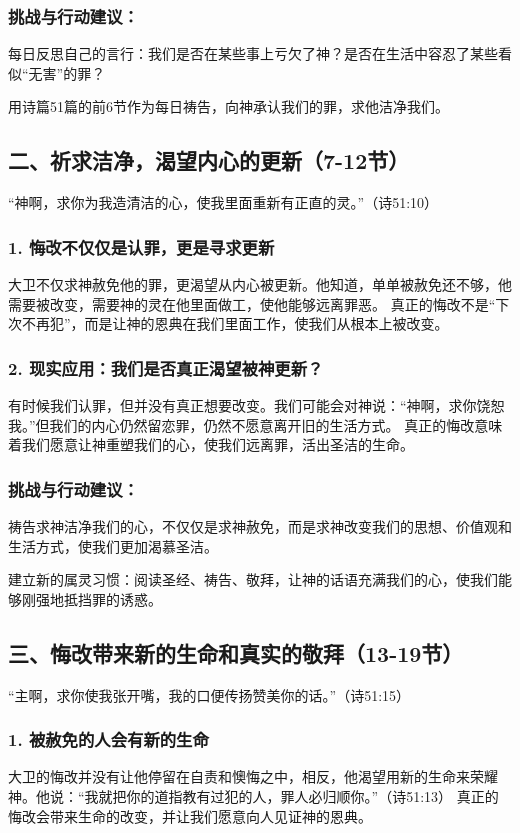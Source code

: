 \documentclass[a4paper, 12pt]{article}
\begin{document}
\subsubsection*{挑战与行动建议：}
\hspace{0.6cm}每日反思自己的言行：我们是否在某些事上亏欠了神？是否在生活中容忍了某些看似“无害”的罪？

用诗篇51篇的前6节作为每日祷告，向神承认我们的罪，求他洁净我们。
\subsection*{二、祈求洁净，渴望内心的更新（7-12节）}
“神啊，求你为我造清洁的心，使我里面重新有正直的灵。”（诗51:10）

\subsubsection*{1. 悔改不仅仅是认罪，更是寻求更新}
大卫不仅求神赦免他的罪，更渴望从内心被更新。他知道，单单被赦免还不够，他需要被改变，需要神的灵在他里面做工，使他能够远离罪恶。
真正的悔改不是“下次不再犯”，而是让神的恩典在我们里面工作，使我们从根本上被改变。
\subsubsection*{2. 现实应用：我们是否真正渴望被神更新？}
有时候我们认罪，但并没有真正想要改变。我们可能会对神说：“神啊，求你饶恕我。”但我们的内心仍然留恋罪，仍然不愿意离开旧的生活方式。
真正的悔改意味着我们愿意让神重塑我们的心，使我们远离罪，活出圣洁的生命。
\subsubsection*{挑战与行动建议：}
\hspace{0.6cm}祷告求神洁净我们的心，不仅仅是求神赦免，而是求神改变我们的思想、价值观和生活方式，使我们更加渴慕圣洁。

建立新的属灵习惯：阅读圣经、祷告、敬拜，让神的话语充满我们的心，使我们能够刚强地抵挡罪的诱惑。
\subsection*{三、悔改带来新的生命和真实的敬拜（13-19节）}
“主啊，求你使我张开嘴，我的口便传扬赞美你的话。”（诗51:15）

\subsubsection*{1. 被赦免的人会有新的生命}
大卫的悔改并没有让他停留在自责和懊悔之中，相反，他渴望用新的生命来荣耀神。他说：“我就把你的道指教有过犯的人，罪人必归顺你。”（诗51:13）
真正的悔改会带来生命的改变，并让我们愿意向人见证神的恩典。
\end{document}
